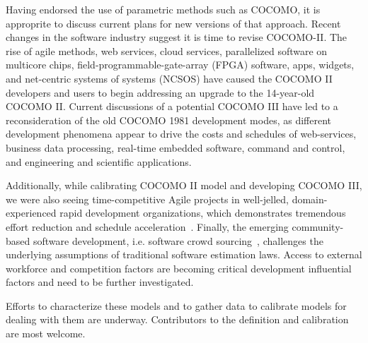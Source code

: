 \documentclass[smallcondesed]{svjour3}
\begin{document}
Having endorsed the use of parametric methods such as COCOMO, it is approprite
to discuss current plans for new versions of that approach.
Recent changes  in the software industry
suggest  it is time  to revise COCOMO-II.
The rise of agile methods, web
services, cloud services, parallelized software on
multicore chips, field-programmable-gate-array
(FPGA) software, apps, widgets, and net-centric
systems of systems (NCSOS) have caused the COCOMO II
developers and users to begin addressing an upgrade
to the 14-year-old COCOMO II. 
Current discussions
of a potential COCOMO III have led to a
reconsideration of the old COCOMO 1981 development
modes, as different development phenomena appear to
drive the costs and schedules of web-services,
business data processing, real-time embedded
software, command and control, and engineering and
scientific applications. 

Additionally, while calibrating COCOMO II model and developing COCOMO III, we were also seeing time-competitive Agile projects in well-jelled, domain-experienced rapid development organizations, which demonstrates tremendous effort reduction and schedule acceleration~\cite{ingold13}. Finally, the emerging community-based software development, i.e. software crowd sourcing~\cite{yang13}, challenges the underlying assumptions of traditional software estimation laws. Access to external workforce and competition factors are becoming critical development influential factors and need to be further investigated.   

Efforts to characterize
these models and to gather data to calibrate models
for dealing with them are underway. Contributors
to the definition and calibration are most  welcome.  


 



\end{document}
